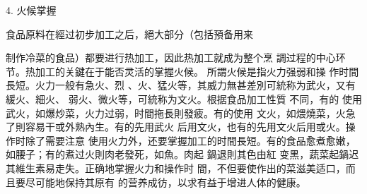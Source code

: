 4.      火候掌握

食品原料在經过初步加工之后，絕大部分（包括預备用来


制作冷菜的食品）都要进行热加工，因此热加工就成为整个烹 調过程的中心环节。热加工的关鍵在于能否灵活的掌握火候。 所謂火候是指火力强弱和操
作时間長短。火力一般有急火、烈 、火、猛火等，其威力無甚差別可統称为武火，又有緩火、細火、 弱火、微火等，可統称为文火。根据食品加工性質
不同，有的 使用武火，如爆炒菜，火力过弱，时間拖長則發疲。有的使用 文火，如煨燒菜，火急了則容易干或外熟內生。有的先用武火 后用文火，也有的先用文火后用或火。操作时除了需要注意 使用火力外，还要掌握加工的时間長短。有的食品愈煮愈嫩， 如腰子；有的煮过火則肉老發死，如魚。肉起
鍋退則其色由紅 变黑，蔬菜起鍋迟其維生素易走失。正确地掌握火力和操作时 間，不但要使作出的菜滋美适口，而且要尽可能地保持其原有 的营养成彷，以求有益于增进人体的健康。
